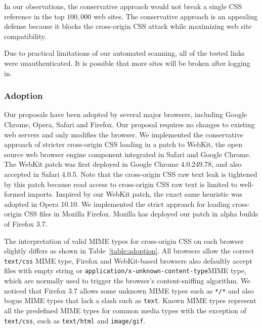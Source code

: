\documentclass{acm_proc_article-sp}
\begin{document}
In our observations, the conservative approach would not break a single CSS reference in the top $100,000$ web sites. The conservative approach is an appealing defense because it blocks the cross-origin CSS attack while maximizing web site compatibility.

Due to practical limitations of our automated scanning, all of the tested links were unauthenticated. It is possible that more sites will be broken after logging in.

\subsubsection{Adoption}
Our proposals have been adopted by several major browsers, including Google Chrome, Opera, Safari and Firefox. Our proposal requires no changes to existing web servers and only modifies the browser. We implemented the conservative approach of stricter cross-origin CSS loading in a patch to WebKit, the open source web browser engine component integrated in Safari and Google Chrome. The WebKit patch was first deployed in Google Chrome 4.0.249.78, and also accepted in Safari 4.0.5. Note that the cross-origin CSS raw text leak is tightened by this patch because read access to cross-origin CSS raw text is limited to well-formed imports. Inspired by our WebKit patch, the exact same heuristic was adopted in Opera 10.10. We implemented the strict approach for loading cross-origin CSS files in Mozilla Firefox. Mozilla has deployed our patch in alpha builds of Firefox 3.7.

The interpretation of valid MIME types for cross-origin CSS on each browser slightly differs as shown in Table~\ref{table:adoption}. All browsers allow the correct \texttt{text/css} MIME type, Firefox and WebKit-based browsers also defaultly accept files with empty string or \texttt{application/x-unknown-content-type}\linebreak MIME type, which are normally used to trigger the browser's content-sniffing algorithm. We noticed that Firefox 3.7 allows some unknown MIME types such as \texttt{*/*} and also bogus MIME types that lack a slash such as \texttt{text}. Known MIME types represent all the predefined MIME types for common media types with the exception of \texttt{text/css}, such as \texttt{text/html} and \texttt{image/gif}.
\end{document}
